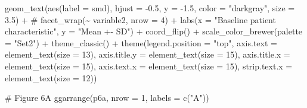 \documentclass[
  letterpaper,
  DIV=11,
  numbers=noendperiod]{scrreprt}
\newenvironment{Shaded}{\begin{snugshade}}{\end{snugshade}}
\newcommand{\AttributeTok}[1]{\textcolor[rgb]{0.40,0.45,0.13}{#1}}
\newcommand{\CommentTok}[1]{\textcolor[rgb]{0.37,0.37,0.37}{#1}}
\newcommand{\DecValTok}[1]{\textcolor[rgb]{0.68,0.00,0.00}{#1}}
\newcommand{\FloatTok}[1]{\textcolor[rgb]{0.68,0.00,0.00}{#1}}
\newcommand{\FunctionTok}[1]{\textcolor[rgb]{0.28,0.35,0.67}{#1}}
\newcommand{\NormalTok}[1]{\textcolor[rgb]{0.00,0.23,0.31}{#1}}
\newcommand{\SpecialCharTok}[1]{\textcolor[rgb]{0.37,0.37,0.37}{#1}}
\newcommand{\StringTok}[1]{\textcolor[rgb]{0.13,0.47,0.30}{#1}}
\begin{document}
\begin{Shaded}
\begin{Highlighting}[]
  \FunctionTok{geom\_text}\NormalTok{(}\FunctionTok{aes}\NormalTok{(}\AttributeTok{label =}\NormalTok{ smd), }\AttributeTok{hjust =} \SpecialCharTok{{-}}\FloatTok{0.5}\NormalTok{, }\AttributeTok{y =} \SpecialCharTok{{-}}\FloatTok{1.5}\NormalTok{, }\AttributeTok{color =} \StringTok{"darkgray"}\NormalTok{, }\AttributeTok{size =} \FloatTok{3.5}\NormalTok{) }\SpecialCharTok{+}
  \CommentTok{\# facet\_wrap(\textasciitilde{} variable2, nrow = 4) +}
  \FunctionTok{labs}\NormalTok{(}\AttributeTok{x =} \StringTok{"Baseline patient characteristic"}\NormalTok{,}
       \AttributeTok{y =} \StringTok{"Mean +{-} SD"}\NormalTok{) }\SpecialCharTok{+}
  \FunctionTok{coord\_flip}\NormalTok{() }\SpecialCharTok{+}
  \FunctionTok{scale\_color\_brewer}\NormalTok{(}\AttributeTok{palette =} \StringTok{"Set2"}\NormalTok{)  }\SpecialCharTok{+}
  \FunctionTok{theme\_classic}\NormalTok{() }\SpecialCharTok{+}
  \FunctionTok{theme}\NormalTok{(}\AttributeTok{legend.position =} \StringTok{"top"}\NormalTok{,}
        \AttributeTok{axis.text =} \FunctionTok{element\_text}\NormalTok{(}\AttributeTok{size =} \DecValTok{13}\NormalTok{),}
        \AttributeTok{axis.title.y =} \FunctionTok{element\_text}\NormalTok{(}\AttributeTok{size =} \DecValTok{15}\NormalTok{),}
        \AttributeTok{axis.title.x =} \FunctionTok{element\_text}\NormalTok{(}\AttributeTok{size =} \DecValTok{15}\NormalTok{),}
        \AttributeTok{axis.text.x =} \FunctionTok{element\_text}\NormalTok{(}\AttributeTok{size =} \DecValTok{15}\NormalTok{),}
        \AttributeTok{strip.text.x =} \FunctionTok{element\_text}\NormalTok{(}\AttributeTok{size =} \DecValTok{12}\NormalTok{))}

\CommentTok{\# Figure 6A}
\FunctionTok{ggarrange}\NormalTok{(p6a, }\AttributeTok{nrow =} \DecValTok{1}\NormalTok{, }\AttributeTok{labels =} \FunctionTok{c}\NormalTok{(}\StringTok{"A"}\NormalTok{))}
\end{Highlighting}
\end{Shaded}
\end{document}
